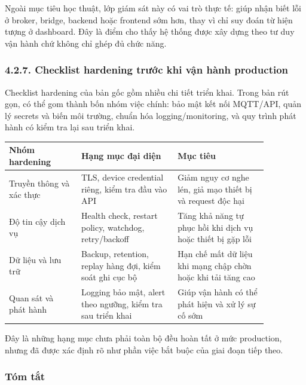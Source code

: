 \documentclass[a4paper]{extarticle}
\begin{document}
Ngoài mục tiêu học thuật, lớp giám sát này có vai trò thực tế: giúp nhận biết lỗi ở broker, bridge, backend hoặc frontend sớm hơn, thay vì chỉ suy đoán từ hiện tượng ở dashboard. Đây là điểm cho thấy hệ thống được xây dựng theo tư duy vận hành chứ không chỉ ghép đủ chức năng.

\subsubsection{4.2.7. Checklist hardening trước khi vận hành
production}\label{427-checklist-hardening-trux1b0ux1edbc-khi-vux1eadn-huxe0nh-production}

Checklist hardening của bản gốc gồm nhiều chi tiết triển khai. Trong bản rút gọn, có thể gom thành bốn nhóm việc chính: bảo mật kết nối MQTT/API, quản lý secrets và biến môi trường, chuẩn hóa logging/monitoring, và quy trình phát hành có kiểm tra lại sau triển khai.

\begin{center}
\begin{tabular}{|p{0.24\linewidth}|p{0.32\linewidth}|p{0.30\linewidth}|}
\hline
\textbf{Nhóm hardening} & \textbf{Hạng mục đại diện} & \textbf{Mục tiêu} \\
\hline
Truyền thông và xác thực & TLS, device credential riêng, kiểm tra đầu vào API & Giảm nguy cơ nghe lén, giả mạo thiết bị và request độc hại \\
\hline
Độ tin cậy dịch vụ & Health check, restart policy, watchdog, retry/backoff & Tăng khả năng tự phục hồi khi dịch vụ hoặc thiết bị gặp lỗi \\
\hline
Dữ liệu và lưu trữ & Backup, retention, replay hàng đợi, kiểm soát ghi cục bộ & Hạn chế mất dữ liệu khi mạng chập chờn hoặc khi tải tăng cao \\
\hline
Quan sát và phát hành & Logging bảo mật, alert theo ngưỡng, kiểm tra sau triển khai & Giúp vận hành có thể phát hiện và xử lý sự cố sớm \\
\hline
\end{tabular}
\end{center}

Đây là những hạng mục chưa phải toàn bộ đều hoàn tất ở mức production, nhưng đã được xác định rõ như phần việc bắt buộc của giai đoạn tiếp theo.

\subsubsection{Tóm
tắt}\label{tuxf3m-tux1eaft}
\end{document}
